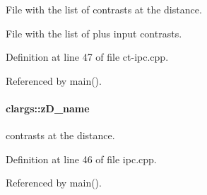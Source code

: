 File with the list of contrasts at the distance. 

File with the list of plus input contrasts. 

Definition at line 47 of file ct-\/ipc.cpp.



Referenced by main().

\hypertarget{structclargs_affa0f7980f981b4a5067b2333060bea8}{
\paragraph[{zD\_\-name}]{ {\bf clargs::zD\_\-name}}\hfill}
\label{structclargs_affa0f7980f981b4a5067b2333060bea8}


contrasts at the distance. 



Definition at line 46 of file ipc.cpp.



Referenced by main().



